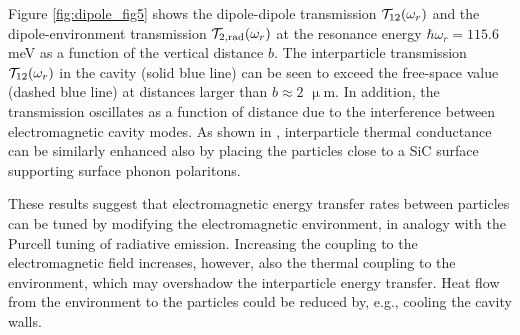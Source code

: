 Figure \ref{fig:dipole_fig5} shows the dipole-dipole transmission $\mathcal{T}_{12}(\omega_r)$ and the dipole-environment transmission $\mathcal{T}_{2,\textrm{rad}}(\omega_r)$ at the resonance energy $\hbar\omega_r=115.6$ meV as a function of the vertical distance $b$. The interparticle transmission $\mathcal{T}_{12}(\omega_r)$ in the cavity (solid blue line) can be seen to exceed the free-space value (dashed blue line) at distances larger than $b\approx 2$ $\upmu$m. In addition, the transmission oscillates as a function of distance due to the interference between electromagnetic cavity modes. As shown in , interparticle thermal conductance can be similarly enhanced also by placing the particles close to a SiC surface supporting surface phonon polaritons.

These results suggest that electromagnetic energy transfer rates between particles can be tuned by modifying the electromagnetic environment, in analogy with the Purcell tuning of radiative emission. Increasing the coupling to the electromagnetic field increases, however, also the thermal coupling to the environment, which may overshadow the interparticle energy transfer. Heat flow from the environment to the particles could be reduced by, e.g., cooling the cavity walls. 

